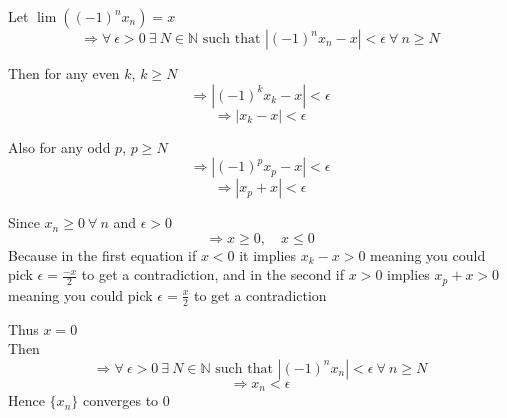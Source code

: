 \documentclass{article}
\begin{document}
Let \(\lim((-1)^n x_n) = x\)
\[
\Rightarrow \forall \ \epsilon > 0 \ \exists \ N \in \mathbb{N} \text{ such that } |(-1)^nx_n - x| < \epsilon \ \forall \ n \geq N
\]

Then for any even \(k\), \(k\geq N\)
\[
\Rightarrow |(-1)^k x_k - x| < \epsilon 
\]
\[
\Rightarrow |x_k - x| < \epsilon 
\]


Also for any odd \(p\), \(p \geq N\)
\[
\Rightarrow |(-1)^px_p - x| < \epsilon 
\]
\[
\Rightarrow |x_p + x| < \epsilon 
\]

Since \(x_n \geq 0 \ \forall \ n\) and \(\epsilon  > 0\)
\[
\Rightarrow x \geq 0, \quad x \leq 0
\]
Because in the first equation if \(x < 0\) it implies \(x_k - x > 0\) meaning you could pick \(\epsilon  = \frac{-x}{2}\)
to get a contradiction, and in the second if \(x > 0\) implies \(x_p + x > 0\) meaning you could pick \(\epsilon  = \frac{x}{2}\)
to get a contradiction

Thus \(x=0\)
\\

Then
\[
\Rightarrow \forall \ \epsilon > 0 \ \exists \ N \in \mathbb{N} \text{ such that } |(-1)^nx_n | < \epsilon \ \forall \ n \geq N
\]
\[
\Rightarrow x_n < \epsilon 
\]
Hence \(\{x_n\}\) converges to \(0\)
\end{document}
